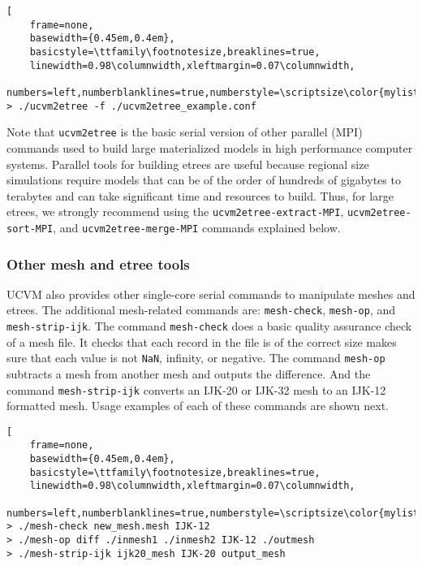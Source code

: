 \begin{lstlisting}[
	frame=none,
	basewidth={0.45em,0.4em},
	basicstyle=\ttfamily\footnotesize,breaklines=true,
	linewidth=0.98\columnwidth,xleftmargin=0.07\columnwidth,
	numbers=left,numberblanklines=true,numberstyle=\scriptsize\color{mylistingnclr}]
> ./ucvm2etree -f ./ucvm2etree_example.conf
\end{lstlisting}

Note that \texttt{ucvm2etree} is the basic serial version of other parallel (MPI) commands used to build large materialized models in high performance computer systems. Parallel tools for building etrees are useful because regional size simulations require models that can be of the order of hundreds of gigabytes to terabytes and can take significant time and resources to build. Thus, for large etrees, we strongly recommend using the \texttt{ucvm2etree-extract-MPI}, \texttt{ucvm2etree-sort-MPI}, and \texttt{ucvm2etree-merge-MPI} commands explained below.

\subsubsection{Other mesh and etree tools}

UCVM also provides other single-core serial commands to manipulate meshes and etrees. The additional mesh-related commands are: \texttt{mesh-check}, \texttt{mesh-op}, and \texttt{mesh-strip-ijk}. The command \texttt{mesh-check} does a basic quality assurance check of a mesh file. It checks that each record in the file is of the correct size makes sure that each value is not \texttt{NaN}, infinity, or negative. The command \texttt{mesh-op} subtracts a mesh from another mesh and outputs the difference. And the command \texttt{mesh-strip-ijk} converts an IJK-20 or IJK-32 mesh to an IJK-12 formatted mesh. Usage examples of each of these commands are shown next.

\begin{lstlisting}[
	frame=none,
	basewidth={0.45em,0.4em},
	basicstyle=\ttfamily\footnotesize,breaklines=true,
	linewidth=0.98\columnwidth,xleftmargin=0.07\columnwidth,
	numbers=left,numberblanklines=true,numberstyle=\scriptsize\color{mylistingnclr}]
> ./mesh-check new_mesh.mesh IJK-12
> ./mesh-op diff ./inmesh1 ./inmesh2 IJK-12 ./outmesh
> ./mesh-strip-ijk ijk20_mesh IJK-20 output_mesh
\end{lstlisting}

